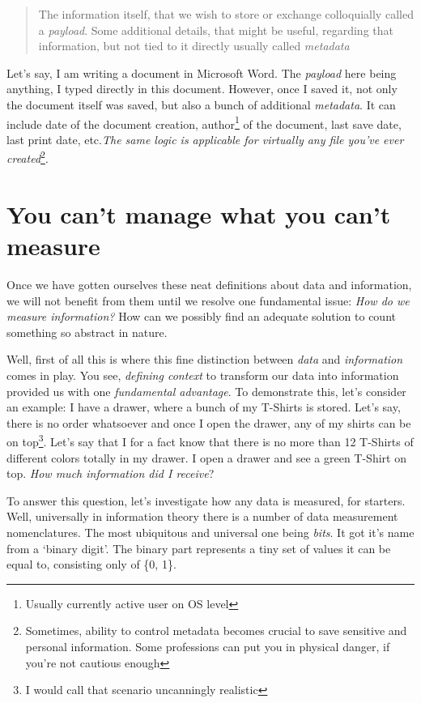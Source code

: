 \documentclass[../../what-is-computer.tex]{subfiles}
\begin{document}
    \begin{quote}
        The information itself, that we wish to store or exchange colloquially called a \emph{payload}. Some additional details, that might be useful, regarding
        that information, but not tied to it directly usually called \emph{metadata}
    \end{quote}

    Let's say, I am writing a document in Microsoft Word. The \emph{payload} here being anything, I typed directly in this document. However, once I saved it, not
    only the document itself was saved, but also a bunch of additional \emph{metadata}. It can include date of the document creation, 
    author\footnote{Usually currently active user on OS level} of the document, last save date, last print date, etc.\emph{The same logic is applicable for virtually
    any file you've ever created}\footnote{Sometimes, ability to control metadata becomes crucial to save sensitive and personal information. 
    Some professions can put you in physical danger, if you're not cautious enough}.\par

    \newpage
    \section{You can't manage what you can't measure}
    Once we have gotten ourselves these neat definitions about data and information, we will not benefit from them until we resolve one fundamental issue:
    \emph{How do we measure information?} How can we possibly find an adequate solution to count something so abstract in nature. \par 

    Well, first of all this is where this fine distinction between \emph{data} and \emph{information} comes in play. You see, \emph{defining context} to transform
    our data into information provided us with one \emph{fundamental advantage}. To demonstrate this, let's consider an example: I have a drawer, where a bunch
    of my T-Shirts is stored. Let's say, there is no order whatsoever and once I open the drawer, any of my shirts can be on top\footnote{I would call
    that scenario uncanningly realistic}. Let's say that I for a fact know that there is no more than 12 T-Shirts of different colors totally in my drawer.
    I open a drawer and see a green T-Shirt on top. \emph{How much information did I receive}? \par

    To answer this question, let's investigate how any data is measured, for starters. Well, universally in information theory there is a number of data 
    measurement nomenclatures. The most ubiquitous and universal one being \emph{bits}. It got it's name from a `binary digit'. The binary part represents a
    tiny set of values it can be equal to, consisting only of \{0, 1\}.
\end{document}
